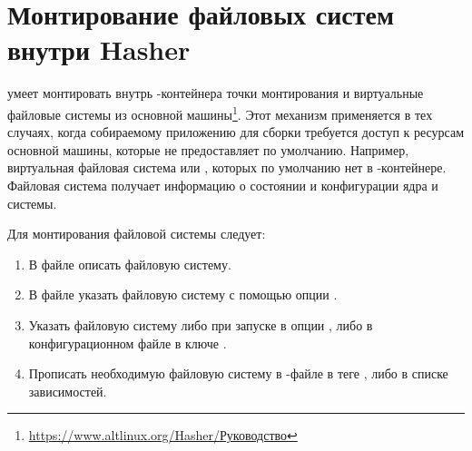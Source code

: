 \section{Монтирование файловых систем внутри Hasher}
 умеет монтировать внутрь -контейнера точки монтирования и виртуальные файловые системы из основной машины\footnote{\href{https://www.altlinux.org/Hasher/\%D0\%A0\%D1\%83\%D0\%BA\%D0\%BE\%D0\%B2\%D0\%BE\%D0\%B4\%D1\%81\%D1\%82\%D0\%B2\%D0\%BE\#\%D0\%9C\%D0\%BE\%D0\%BD\%D1\%82\%D0\%B8\%D1\%80\%D0\%BE\%D0\%B2\%D0\%B0\%D0\%BD\%D0\%B8\%D0\%B5_\%D1\%84\%D0\%B0\%D0\%B9\%D0\%BB\%D0\%BE\%D0\%B2\%D1\%8B\%D1\%85_\%D1\%81\%D0\%B8\%D1\%81\%D1\%82\%D0\%B5\%D0\%BC_\%D0\%B2\%D0\%BD\%D1\%83\%D1\%82\%D1\%80\%D0\%B8_hasher}{https://www.altlinux.org/Hasher/Руководство}}. Этот механизм применяется в тех случаях, когда собираемому приложению для сборки требуется доступ к ресурсам основной машины, которые  не предоставляет по умолчанию. Например, виртуальная файловая система  или , которых по умолчанию нет в -контейнере. Файловая система  получает информацию о состоянии и конфигурации ядра и системы.

Для монтирования файловой системы следует:
\begin{enumerate}
	\item В файле  описать файловую систему.
	\item В файле  указать файловую систему с помощью опции .
	\item Указать файловую систему либо при запуске  в опции , либо в конфигурационном файле  в ключе .
	\item Прописать необходимую файловую систему в -файле в теге , либо в списке зависимостей.
\end{enumerate} 